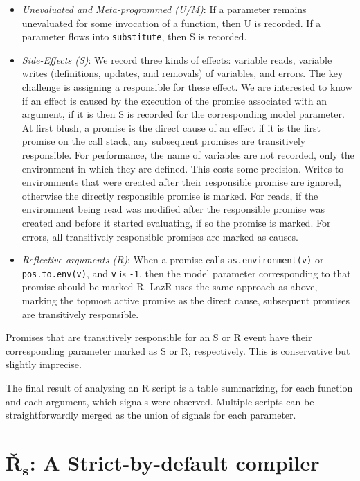 \documentclass[review,creen,acmsmall]{acmart}
\newcommand{\code}[1]{\lstinline |#1|\xspace}
\renewcommand{\c}[1]{\lstinline |#1|\xspace}
\newcommand{\lazr}{{\sf LazR}\xspace}
\begin{document}
\begin{itemize}[---]
  \item {\it Unevaluated and Meta-programmed (U/M)}: If a parameter remains
    unevaluated for some invocation of a function, then U is recorded. If a
    parameter flows into \c{substitute}, then S is recorded.
\item {\it Side-Effects (S)}: We record three kinds of effects: variable reads,
  variable writes (definitions, updates, and removals) of variables, and errors.
  The key challenge is assigning a responsible for these effect. We are
  interested to know if an effect is caused by the execution of the promise
  associated with an argument, if it is then S is recorded for the corresponding
  model parameter. At first blush, a promise is the direct cause of an effect if
  it is the first promise on the call stack, any subsequent promises are
  transitively responsible. For performance, the name of variables are not
  recorded, only the environment in which they are defined. This costs some
  precision. Writes to environments that were created after their responsible
  promise are ignored, otherwise the directly responsible promise is marked. For
  reads, if the environment being read was modified after the responsible
  promise was created and before it started evaluating, if so the promise is
  marked. For errors, all transitively responsible promises are marked as
  causes.
\item {\it Reflective arguments (R)}: When a promise calls
  \code{as.environment(v)} or \code{pos.to.env(v)}, and \c v is \c{-1}, then the
  model parameter corresponding to that promise should be marked R. \lazr uses
  the same approach as above, marking the topmost active promise as the direct
  cause, subsequent promises are transitively responsible.
\end{itemize}

Promises that are transitively responsible for an S or R event have their
corresponding parameter marked as S or R, respectively. This is conservative but
slightly imprecise.

The final result of analyzing an R script is a table summarizing, for each
function and each argument, which signals were observed. Multiple scripts can be
straightforwardly merged as the union of signals for each parameter.

\section{\v R$_{\mathbf s}$: A Strict-by-default compiler}\label{sec:rsh1}
\end{document}
